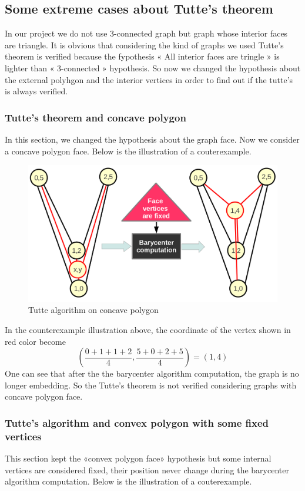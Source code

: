 \subsection{Some extreme cases about Tutte's theorem}
In our project we do not use 3-connected graph but graph whose interior faces are triangle. It is obvious that considering the kind of graphs we used Tutte's theorem is verified because the fypothesis « All interior faces are tringle » is lighter than « 3-connected » hypothesis. So now we changed the hypothesis about the external polyhgon and the interior vertices in order to find out if the tutte's  is always verified.  

\subsubsection{Tutte's theorem and concave polygon}

In this section, we changed the hypothesis about the graph face. Now we consider a concave polygon face. Below is the illustration of a couterexample. 

\begin {figure}[H]
  \centering
  \includegraphics[scale=0.3]{img/tutte2.png}
  \caption{Tutte algorithm on concave polygon}
  \label{tutte2}
\end {figure}
\noindent
In the counterexample illustration above, the coordinate of the vertex shown in red color become $$(\frac{0+1+1+2}{4} , \frac{5+0+2+5}{4}) = (1 , 4)$$
One can see that after the the barycenter algorithm computation, the graph is no longer embedding. So the Tutte's theorem is not verified considering graphs with concave polygon face. 

\subsubsection{Tutte's algorithm and convex polygon with some fixed vertices}
This section kept the «convex polygon face» hypothesis but some internal vertices are considered fixed, their position never change during the barycenter algorithm computation. Below is the illustration of a couterexample. 

